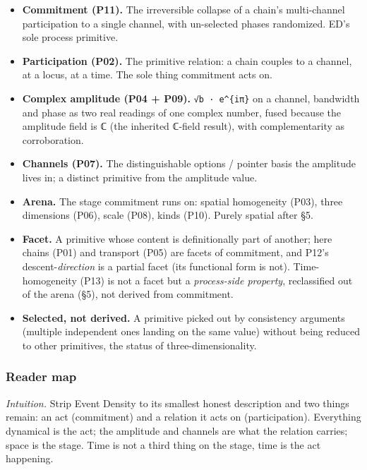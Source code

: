\documentclass[
  11pt,
]{article}
\providecommand{\tightlist}{%
  \setlength{\itemsep}{0pt}\setlength{\parskip}{0pt}}
\begin{document}
\begin{itemize}
\tightlist
\item
  \textbf{Commitment (P11).} The irreversible collapse of a chain's
  multi-channel participation to a single channel, with un-selected
  phases randomized. ED's sole process primitive.
\item
  \textbf{Participation (P02).} The primitive relation: a chain couples
  to a channel, at a locus, at a time. The sole thing commitment acts
  on.
\item
  \textbf{Complex amplitude (P04 + P09).} \texttt{√b\ ·\ e\^{}\{iπ\}} on
  a channel, bandwidth and phase as two real readings of one complex
  number, fused because the amplitude field is ℂ (the inherited ℂ-field
  result), with complementarity as corroboration.
\item
  \textbf{Channels (P07).} The distinguishable options / pointer basis
  the amplitude lives in; a distinct primitive from the amplitude value.
\item
  \textbf{Arena.} The stage commitment runs on: spatial homogeneity
  (P03), three dimensions (P06), scale (P08), kinds (P10). Purely
  spatial after §5.
\item
  \textbf{Facet.} A primitive whose content is definitionally part of
  another; here chains (P01) and transport (P05) are facets of
  commitment, and P12's descent-\emph{direction} is a partial facet (its
  functional form is not). Time-homogeneity (P13) is not a facet but a
  \emph{process-side property}, reclassified out of the arena (§5), not
  derived from commitment.
\item
  \textbf{Selected, not derived.} A primitive picked out by consistency
  arguments (multiple independent ones landing on the same value)
  without being reduced to other primitives, the status of
  three-dimensionality.
\end{itemize}

\subsubsection{Reader map}\label{reader-map}

\emph{Intuition.} Strip Event Density to its smallest honest description
and two things remain: an act (commitment) and a relation it acts on
(participation). Everything dynamical is the act; the amplitude and
channels are what the relation carries; space is the stage. Time is not
a third thing on the stage, time is the act happening.
\end{document}
